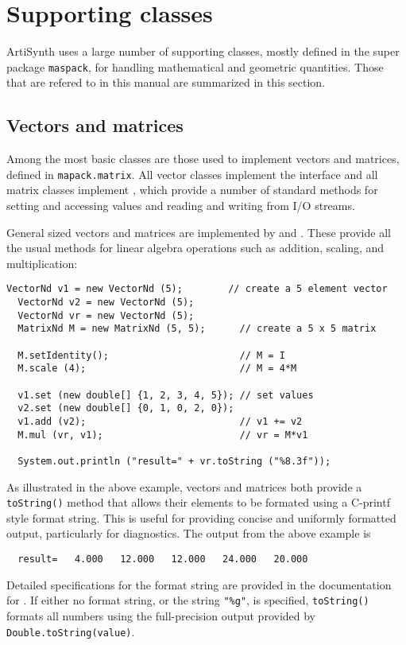 \section{Supporting classes}

ArtiSynth uses a large number of supporting classes, mostly defined in
the super package {\tt maspack}, for handling mathematical and
geometric quantities. Those that are refered to in this manual are
summarized in this section.

\subsection{Vectors and matrices}

Among the most basic classes are those used to implement vectors and
matrices, defined in {\tt mapack.matrix}. All vector classes implement
the interface  and all matrix
classes implement , which provide a
number of standard methods for setting and accessing values and
reading and writing from I/O streams. 

General sized vectors and matrices are implemented by
 and
. These provide all the usual
methods for linear algebra operations such as addition, scaling, and
multiplication:
%
\begin{lstlisting}[]
  VectorNd v1 = new VectorNd (5);        // create a 5 element vector
  VectorNd v2 = new VectorNd (5); 
  VectorNd vr = new VectorNd (5); 
  MatrixNd M = new MatrixNd (5, 5);      // create a 5 x 5 matrix

  M.setIdentity();                       // M = I
  M.scale (4);                           // M = 4*M

  v1.set (new double[] {1, 2, 3, 4, 5}); // set values
  v2.set (new double[] {0, 1, 0, 2, 0});
  v1.add (v2);                           // v1 += v2
  M.mul (vr, v1);                        // vr = M*v1

  System.out.println ("result=" + vr.toString ("%8.3f"));
\end{lstlisting}
%
As illustrated in the above example, vectors and matrices both provide
a {\tt toString()} method that allows their elements to be formated
using a C-printf style format string. This is useful for providing
concise and uniformly formatted output, particularly for diagnostics.
The output from the above example is
%
\begin{verbatim}
  result=   4.000   12.000   12.000   24.000   20.000
\end{verbatim}
%
Detailed specifications for the format string are provided in the
documentation for .
If either no format string, or the string {\tt "\%g"}, is specified,
{\tt toString()} formats all numbers using the full-precision output
provided by {\tt Double.toString(value)}.

